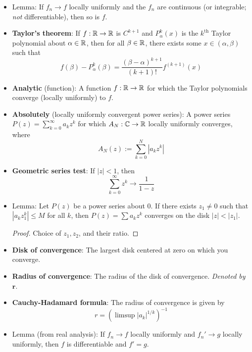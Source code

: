 \documentclass[../notes.tex]{subfiles}
\begin{document}
\begin{itemize}
    \item Lemma: If $f_n\to f$ locally uniformly and the $f_n$ are continuous (or integrable; \emph{not} differentiable), then so is $f$.
    \item \textbf{Taylor's theorem}: If $f:\mathbb{R}\to\mathbb{R}$ is $C^{k+1}$ and $P_\alpha^k(x)$ is the $k^\text{th}$ Taylor polynomial about $\alpha\in\mathbb{R}$, then for all $\beta\in\mathbb{R}$, there exists some $x\in(\alpha,\beta)$ such that
    \begin{equation*}
        f(\beta)-P_\alpha^k(\beta) = \frac{(\beta-\alpha)^{k+1}}{(k+1)!}f^{(k+1)}(x)
    \end{equation*}
    \item \textbf{Analytic} (function): A function $f:\mathbb{R}\to\mathbb{R}$ for which the Taylor polynomials converge (locally uniformly) to $f$.
    \item \textbf{Absolutely} (locally uniformly convergent power series): A power series $P(z)=\sum_{k=0}^\infty a_kz^k$ for which $A_N:\mathbb{C}\to\mathbb{R}$ locally uniformly converges, where
    \begin{equation*}
        A_N(z) := \sum_{k=0}^N|a_kz^k|
    \end{equation*}
    \item \textbf{Geometric series test}: If $|z|<1$, then
    \begin{equation*}
        \sum_{k=0}^\infty z^k \to \frac{1}{1-z}
    \end{equation*}
    \item Lemma: Let $P(z)$ be a power series about 0. If there exists $z_1\neq 0$ such that $|a_kz_1^k|\leq M$ for all $k$, then $P(z)=\sum a_kz^k$ converges on the disk $|z|<|z_1|$.
    \begin{proof}
        Choice of $z_1,z_2$, and their ratio.
    \end{proof}
    \item \textbf{Disk of convergence}: The largest disk centered at zero on which you converge.
    \item \textbf{Radius of convergence}: The radius of the disk of convergence. \emph{Denoted by} $\bm{r}$.
    \item \textbf{Cauchy-Hadamard formula}: The radius of convergence is given by
    \begin{equation*}
        r = (\limsup|a_k|^{1/k})^{-1}
    \end{equation*}
    \item Lemma (from real analysis): If $f_n\to f$ locally uniformly and $f_n'\to g$ locally uniformly, then $f$ is differentiable and $f'=g$.

\end{itemize}
\end{document}
